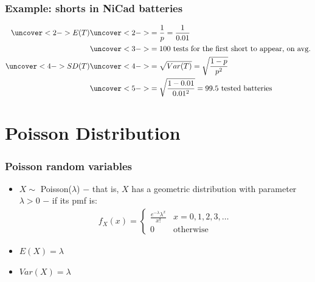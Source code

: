 \documentclass[handout]{beamer}\usepackage[]{graphicx}\usepackage[]{color}
\numberwithin{equation}{section}
\begin{document}
\begin{frame}
\frametitle{Example: shorts in NiCad batteries}
\begin{align*}
\uncover<2->{E(T)} & \uncover<2->{ = \frac{1}{p} = \frac{1}{0.01}} \\
&\uncover<3->{ = 100 \text{ tests for the first short to appear, on avg.}} \\
\uncover<4->{ SD(T)} &\uncover<4->{ = \sqrt{Var(T)} = \sqrt{\frac{1-p}{p^2}}} \\
& \uncover<5->{=  \sqrt{\frac{1-0.01}{0.01^2}} = 99.5 \text{ tested batteries}}
\end{align*}
\end{frame}






\section{ Poisson Distribution}


\begin{frame}
\frametitle{Poisson random variables}
\begin{itemize}
\pause \item $X \sim $ Poisson($\lambda$) $-$ that is, $X$ has a geometric distribution with parameter $\lambda > 0$ $-$ if its pmf is:
\pause \begin{align*}
f_X(x) = \begin{cases}
\frac{e^{-\lambda}\lambda^x}{x!} & x = 0,1 , 2, 3, \ldots \\
0 & \text{otherwise}
\end{cases}
\end{align*}
\pause \item $E(X) = \lambda$
\pause \item $Var(X) = \lambda$
\end{itemize}
\end{frame}
\end{document}
